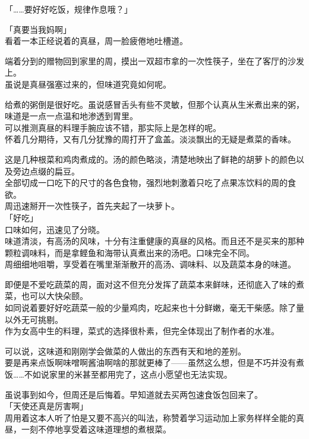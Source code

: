 「……要好好吃饭，规律作息哦？」

「真要当我妈啊」\\

看着一本正经说着的真昼，周一脸疲倦地吐槽道。\\

\vspace{2\baselineskip}

端着分到的赠物回到家里的周，摸出一双超市拿的一次性筷子，坐在了客厅的沙发上。\\

虽说是真昼强塞过来的，但味道究竟如何呢。

给煮的粥倒是很好吃。虽说感冒舌头有些不灵敏，但那个认真从生米煮出来的粥，味道是一点一点温和地渗透到胃里。\\

可以推测真昼的料理手腕应该不错，那实际上是怎样的呢。\\

怀着几分期待，又有几分犹豫的周打开了盒盖。淡淡飘出的无疑是煮菜的香味。

这是几种根菜和鸡肉煮成的。汤的颜色略淡，清楚地映出了鲜艳的胡萝卜的颜色以及旁边点缀的扁豆。\\

全部切成一口吃下的尺寸的各色食物，强烈地刺激着只吃了点果冻饮料的周的食欲。\\

周迅速掰开一次性筷子，首先夹起了一块萝卜。\\

「好吃」\\

口味如何，迅速见了分晓。\\

味道清淡，有高汤的风味，十分有注重健康的真昼的风格。而且还不是买来的那种颗粒调味料，而是拿鲣鱼和海带认真煮出来的汤吧。口味完全不同。\\

周细细地咀嚼，享受着在嘴里渐渐散开的高汤、调味料、以及蔬菜本身的味道。

即便是不爱吃蔬菜的周，面对这不但充分发挥了蔬菜本来鲜味，还彻底入了味的煮菜，也可以大快朵颐。\\

如同说着要好好吃蔬菜一般的少量鸡肉，吃起来也十分鲜嫩，毫无干柴感。除了量以外无可挑剔。\\

作为女高中生的料理，菜式的选择很朴素，但完全体现出了制作者的水准。

可以说，这味道和刚刚学会做菜的人做出的东西有天和地的差别。\\

要是再来点饭啊味噌啊酱油啊啥的那就更棒了——虽然这么想，但是不巧并没有煮饭……不如说家里的米甚至都用完了，这点小愿望也无法实现。

虽说事到如今，但周还是后悔着。早知道就去买两包速食饭包回来了。\\

「天使还真是厉害啊」\\

周用着这本人听了怕是又要不高兴的叫法，称赞着学习运动加上家务样样全能的真昼，一刻不停地享受着这味道理想的煮根菜。
